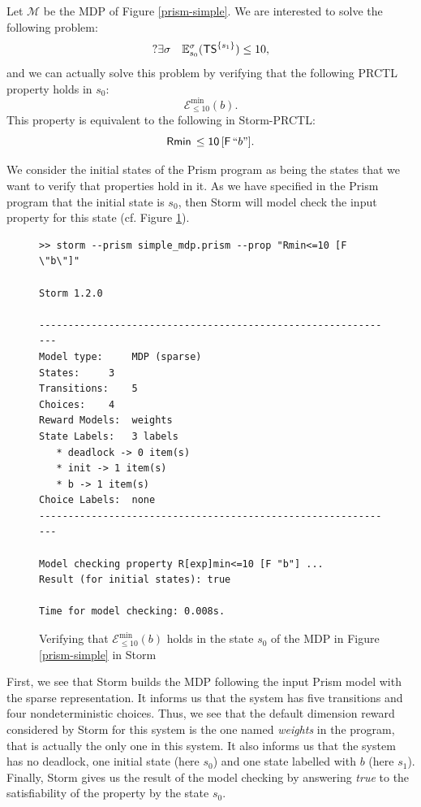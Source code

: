 \begin{example}
Let $\mathcal{M}$ be the MDP of Figure \ref{prism-simple}.
We are interested to solve the following \SSPE{} problem:
\[
  ?\exists \sigma \quad \mathbb{E}_{s_0}^\sigma(\text{\sffamily TS}^{\{s_1\}}) \leq 10,
\]
and we can actually solve this problem by verifying that the following PRCTL property holds in $s_0$:
\[
  \mathcal{E}_{\leq 10}^{\min}(b).
\]
This property is equivalent to the following in Storm-PRCTL:
\[
  \mathsf{Rmin\,\leq 10\, [F \,} ``b"].
\]

We consider the initial states of the Prism program as being the states that we want to verify that properties hold in it.
As we have specified in the Prism program that the initial state is $s_0$, then Storm will model check the input property for this state (cf. Figure \ref{storm-program-2}).

\begin{figure}[h!]
{\footnotesize
\begin{verbatim}
>> storm --prism simple_mdp.prism --prop "Rmin<=10 [F \"b\"]"

Storm 1.2.0

--------------------------------------------------------------
Model type: 	MDP (sparse)
States: 	3
Transitions: 	5
Choices: 	4
Reward Models:  weights
State Labels: 	3 labels
   * deadlock -> 0 item(s)
   * init -> 1 item(s)
   * b -> 1 item(s)
Choice Labels: 	none
--------------------------------------------------------------

Model checking property R[exp]min<=10 [F "b"] ...
Result (for initial states): true

Time for model checking: 0.008s.
\end{verbatim}
}
\captionsetup{justification=centering}
\caption{Verifying that $\mathcal{E}_{\leq 10}^{\min}(b)$ holds in the state $s_0$ of the MDP in Figure \ref{prism-simple} in Storm}
\label{storm-program-2}
\end{figure}
\noindent First, we see that Storm builds the MDP following the input Prism model with the sparse representation. It informs us that the system has five transitions and four nondeterministic choices. Thus, we see that the default dimension reward considered by Storm for this system is the one named \textit{weights} in the program, that is actually the only one in this system.
It also informs us that the system has no deadlock, one initial state (here $s_0$) and one state labelled with $b$ (here $s_1$).
Finally, Storm gives us the result of the model checking by answering \textit{true} to the satisfiability of the property by the state $s_0$.
\end{example}
